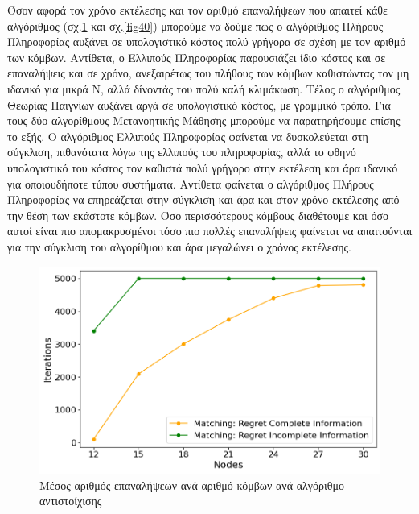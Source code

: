 Όσον αφορά τον χρόνο εκτέλεσης και τον αριθμό επαναλήψεων που απαιτεί κάθε αλγόριθμος (σχ.\ref{fig39} και σχ.\ref{fig40}) μπορούμε να δούμε πως ο αλγόριθμος Πλήρους Πληροφορίας αυξάνει σε υπολογιστικό κόστος πολύ γρήγορα σε σχέση με τον αριθμό των κόμβων. Αντίθετα, ο Ελλιπούς Πληροφορίας παρουσιάζει ίδιο κόστος και σε επαναλήψεις και σε χρόνο, ανεξαιρέτως του πλήθους των κόμβων καθιστώντας τον μη ιδανικό για μικρά Ν, αλλά δίνοντάς του πολύ καλή κλιμάκωση.  Τέλος ο αλγόριθμος Θεωρίας Παιγνίων αυξάνει αργά σε υπολογιστικό κόστος, με γραμμικό τρόπο. Για τους δύο αλγορίθμους Μετανοητικής Μάθησης μπορούμε να παρατηρήσουμε επίσης το εξής. Ο αλγόριθμος Ελλιπούς Πληροφορίας φαίνεται να δυσκολεύεται στη σύγκλιση, πιθανότατα λόγω της ελλιπούς του πληροφορίας, αλλά το φθηνό υπολογιστικό του κόστος τον καθιστά πολύ γρήγορο στην εκτέλεση και άρα ιδανικό για οποιουδήποτε τύπου συστήματα. Αντίθετα φαίνεται ο αλγόριθμος Πλήρους Πληροφορίας να επηρεάζεται στην σύγκλιση και άρα και στον χρόνο εκτέλεσης από την θέση των εκάστοτε κόμβων. Όσο περισσότερους κόμβους διαθέτουμε και όσο αυτοί είναι πιο απομακρυσμένοι τόσο πιο πολλές επαναλήψεις φαίνεται να απαιτούνται για την σύγκλιση του αλγορίθμου και άρα μεγαλώνει ο χρόνος εκτέλεσης.

\newpage

\begin{figure}[H]
    \centering
    \includegraphics[width=\textwidth]{figures/chapter4/Iterations_vs_Users.png}
    \caption{Μέσος αριθμός επαναλήψεων ανά αριθμό κόμβων ανά αλγόριθμο αντιστοίχισης}
    \label{fig39}
\end{figure}

